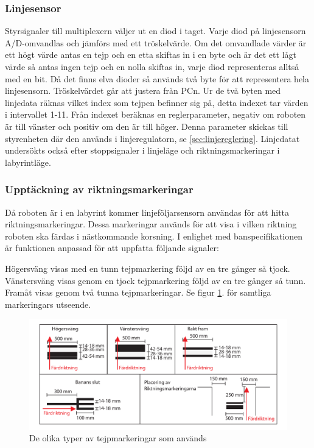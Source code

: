 \subsubsection{Linjesensor}
Styrsignaler till multiplexern väljer ut en diod i taget.
Varje diod på linjesensorn A/D-omvandlas och jämförs med ett tröskelvärde. Om
det omvandlade värder är
ett högt värde antas en tejp och en etta skiftas in i en byte och är det 
ett lågt värde så antas ingen tejp och en nolla skiftas in, varje diod
representeras alltså med en bit. Då det finns elva dioder så används två byte 
för att representera hela linjesensorn. Tröskelvärdet går att justera från PCn. 
Ur de två byten med linjedata räknas vilket index som tejpen befinner sig på,
detta indexet tar värden i intervallet 1-11. Från indexet beräknas en
reglerparameter, negativ om roboten är till vänster och positiv om den är till
höger. Denna parameter skickas till styrenheten där den används i
linjeregulatorn, se \ref{sec:linjereglering}. Linjedatat undersökts också efter
stoppsignaler i linjeläge och riktningsmarkeringar i labyrintläge.

\subsubsection{Upptäckning av riktningsmarkeringar}
\label{sec:riktmark}
Då roboten är i en labyrint kommer linjeföljarsensorn användas 
för att hitta riktningsmarkeringar. Dessa markeringar används för att visa i 
vilken riktning roboten ska färdas i nästkommande korsning.  I enlighet med 
banspecifikationen är funktionen anpassad för att uppfatta 
följande signaler:

Högersväng visas med en tunn tejpmarkering följd av en tre gånger så tjock.
Vänstersväng visas genom en tjock tejpmarkering följd av en tre gånger så tunn.
Framåt visas genom två tunna tejpmarkeringar. Se figur \ref{fig:tejpmarkeringar}.
för samtliga markeringars utseende.

\begin{figure}[H]
  \centering
 \includegraphics[angle=0,scale=0.5]{bilder/tejpmarkeringar.pdf}
  \caption{De olika typer av tejpmarkeringar som används}
  \label{fig:tejpmarkeringar}
\end{figure}


